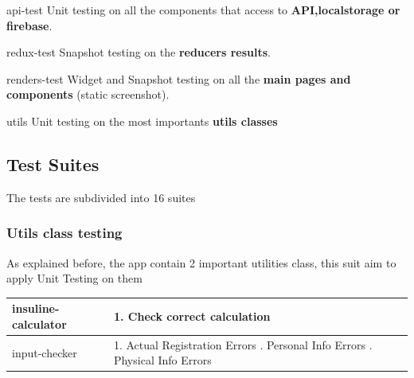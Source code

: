 \documentclass[12pt,hidelinks]{article}
\begin{document}
\begin{docCommand}{api-test}{}
	Unit testing on all the components that access to \textbf{API,localstorage or firebase}.
\end{docCommand}

\begin{docCommand}{redux-test}{}
	Snapshot testing on the \textbf{reducers results}.
\end{docCommand}

\begin{docCommand}{renders-test}{}
	Widget and Snapshot testing on all the \textbf{main pages and components} (static screenshot).
\end{docCommand}

\begin{docCommand}{utils}{}
   Unit testing on the most importants \textbf{utils classes}
\end{docCommand}

\subsection{Test Suites}
The tests are subdivided into 16 suites
\subsubsection*{Utils class testing}
As explained before, the app contain 2 important utilities class, this suit aim to apply Unit Testing on them
\begin{center} 
\begin{tabular}{ |p{4cm}|p{5cm}|  }
	\hline
	insuline-calculator & 
	1. Check correct calculation \\
	\hline
	input-checker & 
	1. Actual Registration Errors \newline    
	2. Personal Info Errors \newline    
	3. Physical Info Errors \newline     
	  \\
	\hline
\end{tabular}
\end{center}
\end{document}
